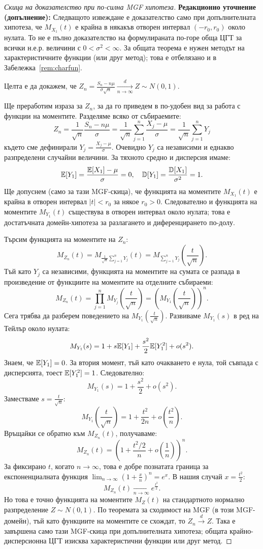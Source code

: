 \begin{proof}[Скица на доказателство при по-силна MGF хипотеза]
\textbf{Редакционно уточнение (допълнение):} Следващото извеждане е доказателство само
при допълнителната хипотеза, че $M_{X_1}(t)$ е крайна в някакъв отворен интервал
$(-r_0,r_0)$ около нулата. То не е пълно доказателство на формулираната по-горе
обща ЦГТ за всички н.е.р. величини с $0<\sigma^2<\infty$. За общата теорема е нужен
методът на характеристичните функции (или друг метод); това е отбелязано и в
Забележка~\ref{rem:charfun}.

Целта е да докажем, че $Z_n = \frac{S_n - n\mu}{\sigma \sqrt{n}} \xrightarrow[n \to \infty]{d} Z \sim N(0,1)$.

Ще преработим израза за $Z_n$, за да го приведем в по-удобен вид за работа с функции на моментите. Разделяме всяко от събираемите:
\[ Z_n = \frac{1}{\sqrt{n}} \frac{S_n - n\mu}{\sigma} = \frac{1}{\sqrt{n}} \sum_{j=1}^n \frac{X_j - \mu}{\sigma} = \frac{1}{\sqrt{n}} \sum_{j=1}^n Y_j \]
където сме дефинирали $Y_j = \frac{X_j - \mu}{\sigma}$.
Очевидно $Y_j$ са независими и еднакво разпределени случайни величини. За тяхното средно и дисперсия имаме:
\[ \mathbb{E}[Y_1] = \frac{\mathbb{E}[X_1] - \mu}{\sigma} = 0, \quad \mathbb{D}[Y_1] = \frac{\mathbb{D}[X_1]}{\sigma^2} = 1. \]
Ще допуснем (само за тази MGF-скица), че функцията на моментите $M_{X_1}(t)$ е
крайна в отворен интервал $|t|<r_0$ за някое $r_0>0$. Следователно и
функцията на моментите $M_{Y_1}(t)$ съществува в отворен интервал около нулата;
това е достатъчната домейн-хипотеза за разлагането и диференцирането по-долу.

Търсим функцията на моментите на $Z_n$:
\[ M_{Z_n}(t) = M_{\frac{1}{\sqrt{n}} \sum_{j=1}^n Y_j}(t) = M_{\sum_{j=1}^n Y_j}\left(\frac{t}{\sqrt{n}}\right). \]
Тъй като $Y_j$ са независими, функцията на моментите на сумата се разпада в произведение от функциите на моментите на отделните събираеми:
\[ M_{Z_n}(t) = \prod_{j=1}^n M_{Y_j}\left(\frac{t}{\sqrt{n}}\right) = \left( M_{Y_1}\left(\frac{t}{\sqrt{n}}\right) \right)^n. \]
Сега трябва да разберем поведението на $M_{Y_1}\left(\frac{t}{\sqrt{n}}\right)$. Развиваме $M_{Y_1}(s)$ в ред на Тейлър около нулата:
\[ M_{Y_1}(s) = 1 + s\mathbb{E}[Y_1] + \frac{s^2}{2}\mathbb{E}[Y_1^2] + o(s^2). \]
Знаем, че $\mathbb{E}[Y_1] = 0$. За втория момент, тъй като очакването е нула, той съвпада с дисперсията, тоест $\mathbb{E}[Y_1^2] = 1$. Следователно:
\[ M_{Y_1}(s) = 1 + \frac{s^2}{2} + o(s^2). \]
Заместваме $s = \frac{t}{\sqrt{n}}$:
\[ M_{Y_1}\left(\frac{t}{\sqrt{n}}\right) = 1 + \frac{t^2}{2n} + o\left(\frac{t^2}{n}\right). \]
Връщайки се обратно към $M_{Z_n}(t)$, получаваме:
\[ M_{Z_n}(t) = \left( 1 + \frac{t^2 / 2}{n} + o\left(\frac{1}{n}\right) \right)^n. \]
За фиксирано $t$, когато $n \to \infty$, това е добре познатата граница за експоненциалната функция $\lim_{n \to \infty} (1 + \frac{x}{n})^n = e^x$. В нашия случай $x = \frac{t^2}{2}$:
\[ M_{Z_n}(t) \xrightarrow[n \to \infty]{} e^{\frac{t^2}{2}}. \]
Но това е точно функцията на моментите $M_Z(t)$ на стандартното нормално разпределение $Z \sim N(0,1)$. По теоремата за сходимост на MGF (в този MGF-домейн), тъй като функциите на моментите се схождат, то $Z_n \xrightarrow{d} Z$. Така е завършена само тази MGF-скица при допълнителната хипотеза; общата крайно-дисперсионна ЦГТ изисква характеристични функции или друг метод.


\end{proof}
